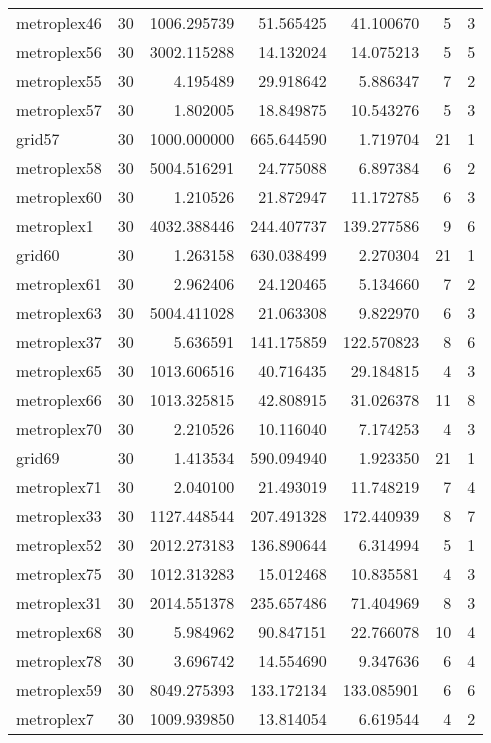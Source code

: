\begin{longtable}{|l|r|r|r|r|r|r|}
metroplex46 & 30 & 1006.295739 & 51.565425 & 41.100670 & 5 & 3 \\
metroplex56 & 30 & 3002.115288 & 14.132024 & 14.075213 & 5 & 5 \\
metroplex55 & 30 & 4.195489 & 29.918642 & 5.886347 & 7 & 2 \\
metroplex57 & 30 & 1.802005 & 18.849875 & 10.543276 & 5 & 3 \\
grid57 & 30 & 1000.000000 & 665.644590 & 1.719704 & 21 & 1 \\
metroplex58 & 30 & 5004.516291 & 24.775088 & 6.897384 & 6 & 2 \\
metroplex60 & 30 & 1.210526 & 21.872947 & 11.172785 & 6 & 3 \\
metroplex1 & 30 & 4032.388446 & 244.407737 & 139.277586 & 9 & 6 \\
grid60 & 30 & 1.263158 & 630.038499 & 2.270304 & 21 & 1 \\
metroplex61 & 30 & 2.962406 & 24.120465 & 5.134660 & 7 & 2 \\
metroplex63 & 30 & 5004.411028 & 21.063308 & 9.822970 & 6 & 3 \\
metroplex37 & 30 & 5.636591 & 141.175859 & 122.570823 & 8 & 6 \\
metroplex65 & 30 & 1013.606516 & 40.716435 & 29.184815 & 4 & 3 \\
metroplex66 & 30 & 1013.325815 & 42.808915 & 31.026378 & 11 & 8 \\
metroplex70 & 30 & 2.210526 & 10.116040 & 7.174253 & 4 & 3 \\
grid69 & 30 & 1.413534 & 590.094940 & 1.923350 & 21 & 1 \\
metroplex71 & 30 & 2.040100 & 21.493019 & 11.748219 & 7 & 4 \\
metroplex33 & 30 & 1127.448544 & 207.491328 & 172.440939 & 8 & 7 \\
metroplex52 & 30 & 2012.273183 & 136.890644 & 6.314994 & 5 & 1 \\
metroplex75 & 30 & 1012.313283 & 15.012468 & 10.835581 & 4 & 3 \\
metroplex31 & 30 & 2014.551378 & 235.657486 & 71.404969 & 8 & 3 \\
metroplex68 & 30 & 5.984962 & 90.847151 & 22.766078 & 10 & 4 \\
metroplex78 & 30 & 3.696742 & 14.554690 & 9.347636 & 6 & 4 \\
metroplex59 & 30 & 8049.275393 & 133.172134 & 133.085901 & 6 & 6 \\
metroplex7 & 30 & 1009.939850 & 13.814054 & 6.619544 & 4 & 2 \\

\end{longtable}

